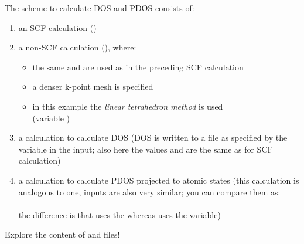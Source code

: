 \documentclass[landscape]{foils}
\begin{document}
The scheme to calculate DOS and PDOS consists of:\vspace{-0.8em}
\begin{enumerate}
\item an SCF  calculation ()\vspace{-0.8em}
\item a non-SCF  calculation (),
  where:\vspace{-0.3em}
  \begin{itemize}
  \item the same  and  are used as in the preceding SCF calculation
  \item a denser k-point mesh is specified
  \item in this example the {\em linear tetrahedron method} is used\\
    (variable )
  \end{itemize}\vspace{-0.8em}
\item a  calculation to calculate DOS {\small (DOS is written to a file as
    specified by the  variable in the  input;
    also here the values  and  are the same
    as for SCF 
    calculation)}\vspace{-0.8em}
\item a  calculation to calculate PDOS projected to
  atomic states {\small (this calculation is analogous to 
    one,
    inputs are also very similar; you can compare them as:}\\[0.5em]
  \\[0.5em]
  {\small the difference is that  uses the 
    whereas  uses the  variable)}
\end{enumerate}
Explore the content of  and  files!  
\end{document}
